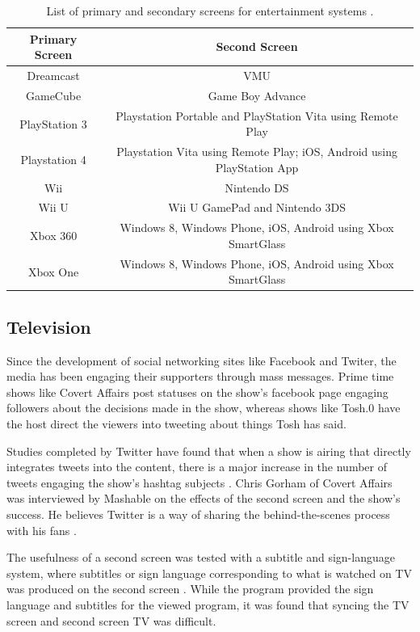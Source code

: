 \documentclass[11pt, oneside]{article}
\begin{document}
\begin{table}[h!]
    \centering
    \caption{List of primary and secondary screens for entertainment systems \cite{wiki_second_screen}.}
    \begin{tabular}{| c | c |}
        \hline
        Primary Screen & Second Screen \\ \hline
        Dreamcast & VMU \\ \hline
        GameCube & Game Boy Advance \\ \hline
        PlayStation 3 & Playstation Portable and PlayStation Vita using Remote Play \\ \hline
        Playstation 4 & Playstation Vita using Remote Play; iOS, Android using PlayStation App \\ \hline
        Wii & Nintendo DS \\ \hline
        Wii U & Wii U GamePad and Nintendo 3DS \\ \hline
        Xbox 360 & Windows 8, Windows Phone, iOS, Android using Xbox SmartGlass \\ \hline
        Xbox One & Windows 8, Windows Phone, iOS, Android using Xbox SmartGlass \\ \hline
    \end{tabular}
    \label{entertainment_table}
\end{table}

\subsection{Television} %
Since the development of social networking sites like Facebook and Twiter, the media has been engaging their supporters through mass messages. Prime time shows like Covert Affairs post statuses on the show's facebook page engaging followers about the decisions made in the show, whereas shows like Tosh.0 have the host direct the viewers into tweeting about things Tosh has said. 

Studies completed by Twitter have found that when a show is airing that directly integrates tweets into the content, there is a major increase in the number of tweets engaging the show's hashtag subjects \cite{TwitterTV}. Chris Gorham of Covert Affairs was interviewed by Mashable on the effects of the second screen and the show's success. He believes Twitter is a way of sharing the behind-the-scenes process with his fans \cite{MashableChris}. 

The usefulness of a second screen was tested with a subtitle and sign-language system, where subtitles or sign language corresponding to what is watched on TV was produced on the second screen \cite{IEEE_EFS}. While the program provided the sign language and subtitles for the viewed program, it was found that syncing the TV screen and second screen TV was difficult.
\end{document}

